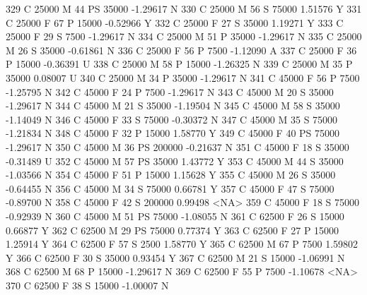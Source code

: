 \documentclass{article}
\begin{document}
\begin{Schunk}
\begin{Soutput}
329       C      25000   M  44        PS  35000  -1.29617    N
330       C      25000   M  56         S  75000   1.51576    Y
331       C      25000   F  67         P  15000  -0.52966    Y
332       C      25000   F  27         S  35000   1.19271    Y
333       C      25000   F  29         S   7500  -1.29617    N
334       C      25000   M  51         P  35000  -1.29617    N
335       C      25000   M  26         S  35000  -0.61861    N
336       C      25000   F  56         P   7500  -1.12090    A
337       C      25000   F  36         P  15000  -0.36391    U
338       C      25000   M  58         P  15000  -1.26325    N
339       C      25000   M  35         P  35000   0.08007    U
340       C      25000   M  34         P  35000  -1.29617    N
341       C      45000   F  56         P   7500  -1.25795    N
342       C      45000   F  24         P   7500  -1.29617    N
343       C      45000   M  20         S  35000  -1.29617    N
344       C      45000   M  21         S  35000  -1.19504    N
345       C      45000   M  58         S  35000  -1.14049    N
346       C      45000   F  33         S  75000  -0.30372    N
347       C      45000   M  35         S  75000  -1.21834    N
348       C      45000   F  32         P  15000   1.58770    Y
349       C      45000   F  40        PS  75000  -1.29617    N
350       C      45000   M  36        PS 200000  -0.21637    N
351       C      45000   F  18         S  35000  -0.31489    U
352       C      45000   M  57        PS  35000   1.43772    Y
353       C      45000   M  44         S  35000  -1.03566    N
354       C      45000   F  51         P  15000   1.15628    Y
355       C      45000   M  26         S  35000  -0.64455    N
356       C      45000   M  34         S  75000   0.66781    Y
357       C      45000   F  47         S  75000  -0.89700    N
358       C      45000   F  42         S 200000   0.99498 <NA>
359       C      45000   F  18         S  75000  -0.92939    N
360       C      45000   M  51        PS  75000  -1.08055    N
361       C      62500   F  26         S  15000   0.66877    Y
362       C      62500   M  29        PS  75000   0.77374    Y
363       C      62500   F  27         P  15000   1.25914    Y
364       C      62500   F  57         S   2500   1.58770    Y
365       C      62500   M  67         P   7500   1.59802    Y
366       C      62500   F  30         S  35000   0.93454    Y
367       C      62500   M  21         S  15000  -1.06991    N
368       C      62500   M  68         P  15000  -1.29617    N
369       C      62500   F  55         P   7500  -1.10678 <NA>
370       C      62500   F  38         S  15000  -1.00007    N

\end{Soutput}
\end{Schunk}
\end{document}
